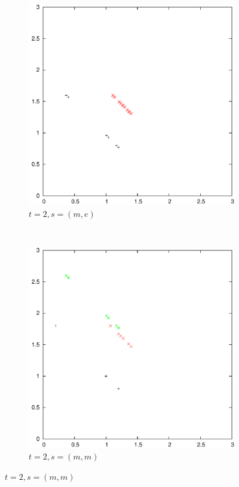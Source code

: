 \documentclass{article}
\begin{document}
\begin{figure}
\begin{subfigure}[b]{0.3\textwidth}
			\includegraphics[width=\textwidth]{images/t2s1}
			\caption{$t=2, s=(m,e)$}
			\label{fig:t2s1}
		\end{subfigure}
		~
		\begin{subfigure}[b]{0.3\textwidth}
			\centering
			\includegraphics[width=\textwidth]{images/t2s3}
			\caption{$t=2, s=(m,m)$}
			\label{fig:t2s3}
		\end{subfigure}


\end{figure}
\end{document}
